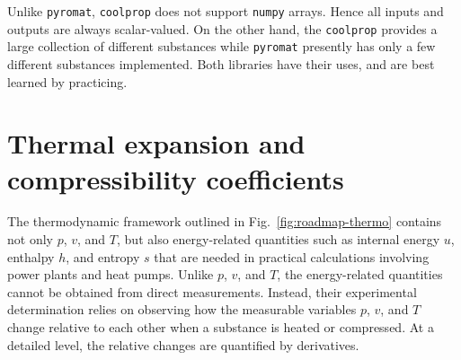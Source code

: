 Unlike \verb|pyromat|, \verb|coolprop| does not support \verb|numpy| arrays. Hence all inputs and outputs are always scalar-valued. On the other hand, the \verb|coolprop| provides a large collection of different substances while \verb|pyromat| presently has only a few different substances implemented. Both libraries have their uses, and are best learned by practicing.

\section{Thermal expansion and compressibility coefficients}
The thermodynamic framework outlined in Fig.~\ref{fig:roadmap-thermo} contains not only $p$, $v$, and $T$, but also energy-related quantities such as internal energy $u$, enthalpy $h$, and entropy $s$ that are needed in practical calculations involving power plants and heat pumps. Unlike $p$, $v$, and $T$, the energy-related quantities cannot be obtained from direct measurements. Instead, their experimental determination relies on observing how the measurable variables $p$, $v$, and $T$ change relative to each other when a substance is heated or compressed. At a detailed level, the relative changes are quantified by derivatives.

